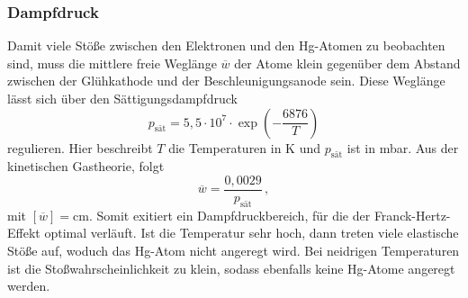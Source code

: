 \subsubsection{Dampfdruck}
Damit viele Stöße zwischen den Elektronen und den Hg-Atomen zu beobachten sind, muss die mittlere freie Weglänge $\overline{w}$ der Atome klein gegenüber dem Abstand
zwischen der Glühkathode und der Beschleunigungsanode sein. Diese Weglänge lässt sich über den Sättigungsdampfdruck 
\begin{equation}
  p_{\text{sät}} = 5,5 \cdot 10^7 \cdot \exp \left(-\frac{6876}{T}\right)
  \label{eqn:Sättigungsdampfdruck}
\end{equation}
regulieren. Hier beschreibt $T$ die Temperaturen in \unit{\kelvin} und $p_{\text{sät}}$ ist in \unit{\milli\bar}. Aus der kinetischen Gastheorie, folgt
\begin{equation}
  \overline{w} = \frac{0,0029}{p_{\text{sät}}}\,,
  \label{eqn:mittlereWeglängeAtome}
\end{equation}
mit $[\overline{w}]=\unit{\centi\metre}$. Somit exitiert ein Dampfdruckbereich, für die der Franck-Hertz-Effekt optimal verläuft. Ist die Temperatur sehr hoch,
dann treten viele elastische Stöße auf, woduch das Hg-Atom nicht angeregt wird. Bei neidrigen Temperaturen ist die Stoßwahrscheinlichkeit zu klein, sodass ebenfalls keine 
Hg-Atome angeregt werden.
